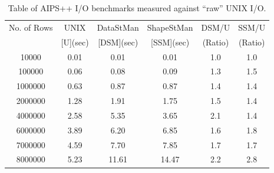\begin{table}[h!]
\begin{center}
\caption{\small Table of AIPS++ I/O benchmarks measured against ``raw'' UNIX
I/O.}
\label{IO_TAB}
\vskip 0.5cm
\begin{tabular}{|c|c|c|c|c|c|}
\hline
No. of Rows &UNIX    & DataStMan & ShapeStMan      &DSM/U    & SSM/U  \\
            &[U](sec)& [DSM](sec)& [SSM](sec)      & (Ratio) & (Ratio)\\
\hline 
10000       & 0.01   & 0.01      & 0.01            & 1.0     &1.0     \\
100000      & 0.06   & 0.08      & 0.09            & 1.3     &1.5     \\
1000000     & 0.63   & 0.87      & 0.87            & 1.4     &1.4     \\
2000000     & 1.28   & 1.91      & 1.75            & 1.5     &1.4     \\
4000000     & 2.58   & 5.35      & 3.65            & 2.1     &1.4     \\
6000000     & 3.89   & 6.20      & 6.85            & 1.6     &1.8     \\
7000000     & 4.59   & 7.70      & 7.85            & 1.7     &1.7     \\
8000000     & 5.23   & 11.61     & 14.47           & 2.2     &2.8     \\
\hline
\end{tabular}
\end{center}
\end{table}

